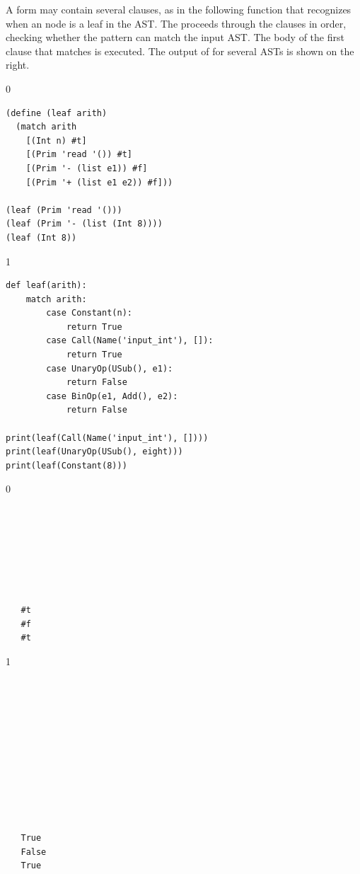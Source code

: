 \documentclass[7x10,nocrop]{TimesAPriori_MIT}%
\def\racketEd{0}
\def\pythonEd{1}
\def\edition{1}
\begin{document}
A  form may contain several clauses, as in the following
function  that recognizes when an \LangInt{} node is a leaf in
the AST. The  proceeds through the clauses in order,
checking whether the pattern can match the input AST. The body of the
first clause that matches is executed. The output of  for
several ASTs is shown on the right.
\begin{center}
\begin{minipage}{0.6\textwidth}
{\if\edition\racketEd
\begin{lstlisting}
(define (leaf arith)
  (match arith
    [(Int n) #t]
    [(Prim 'read '()) #t]
    [(Prim '- (list e1)) #f]
    [(Prim '+ (list e1 e2)) #f]))

(leaf (Prim 'read '()))
(leaf (Prim '- (list (Int 8))))
(leaf (Int 8))
\end{lstlisting}
\fi}
{\if\edition\pythonEd
\begin{lstlisting}
def leaf(arith):
    match arith:
        case Constant(n):
            return True
        case Call(Name('input_int'), []):
            return True
        case UnaryOp(USub(), e1):
            return False
        case BinOp(e1, Add(), e2):
            return False

print(leaf(Call(Name('input_int'), [])))
print(leaf(UnaryOp(USub(), eight)))
print(leaf(Constant(8)))
\end{lstlisting}
\fi}
\end{minipage}
\vrule
\begin{minipage}{0.25\textwidth}
{\if\edition\racketEd  
  \begin{lstlisting}






    
   #t
   #f
   #t
\end{lstlisting}
  \fi}
{\if\edition\pythonEd
\begin{lstlisting}






    



    
   True
   False
   True
\end{lstlisting}
\fi}
\end{minipage}
\end{center}
\end{document}
